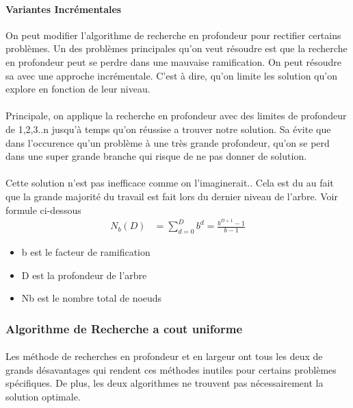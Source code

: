 \documentclass[oneside]{book}
\begin{document}
\paragraph{Variantes Incrémentales}
On peut modifier l'algorithme de recherche en profondeur pour rectifier certains problèmes. Un des problèmes principales qu'on veut résoudre est que la recherche en profondeur peut se perdre dans une mauvaise ramification. On peut résoudre sa avec une approche incrémentale. C'est à dire, qu'on limite les solution qu'on explore en fonction de leur niveau.
\paragraph{}
Principale, on applique la recherche en profondeur avec des limites de profondeur de 1,2,3..n jusqu'à temps qu'on réussise a trouver notre solution. Sa évite que dans l'occurence qu'un problème à une très grande profondeur, qu'on se perd dans une super grande branche qui risque de ne pas donner de solution.
\paragraph{}
Cette solution n'est pas inefficace comme on l'imaginerait.. Cela est du au fait que la grande majorité du travail est fait lors du dernier niveau de l'arbre. Voir formule ci-dessous
\begin{align*}
N_{b}(D) &= \sum^D_{d=0} b^d = \frac{b^{D+1}-1}{b-1}
\end{align*}

\begin{itemize}
\centering
\item {b est le facteur de ramification}
\item {D est la profondeur de l'arbre}
\item {Nb est le nombre total de noeuds}

\end{itemize}

\subsubsection{Algorithme de Recherche a cout uniforme}

\paragraph{}
Les méthode de recherches en profondeur et en largeur ont tous les deux de grands désavantages qui rendent ces méthodes inutiles pour certains problèmes spécifiques. De plus, les deux algorithmes ne trouvent pas nécessairement la solution optimale.
\end{document}
